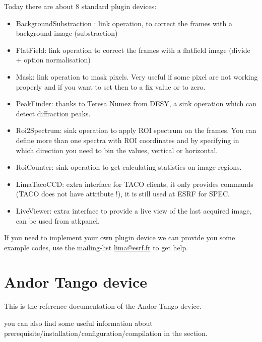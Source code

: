 \documentclass[letterpaper,10pt,english]{sphinxmanual}
\begin{document}
Today there are about  8 standard plugin devices:
\begin{itemize}
\item {} 
BackgroundSubstraction : link operation, to correct the frames with a background image (substraction)

\item {} 
FlatField:               link operation to correct the frames with a flatfield image (divide + option normalisation)

\item {} 
Mask:                    link operation to mask pixels. Very useful if some pixel are not working properly and if you want to set then to a fix value or to zero.

\item {} 
PeakFinder:              thanks to Teresa Numez from DESY, a sink operation which can detect diffraction peaks.

\item {} 
Roi2Spectrum:            sink operation to apply ROI spectrum on the frames. You can define more than one spectra with ROI coordinates and by specifying in which direction you need to bin the values, vertical or horizontal.

\item {} 
RoiCounter:              sink operation to get calculating statistics on image regions.

\item {} 
LimaTacoCCD: extra interface for TACO clients, it only provides commands (TACO does not have attribute !), it is still used at ESRF for SPEC.

\item {} 
LiveViewer:  extra interface  to provide a live view of the last acquired image, can be used from atkpanel.

\end{itemize}

If you need to implement your own plugin device we can provide you some example codes, use the mailing-list \href{mailto:lima@esrf.fr}{lima@esrf.fr} to get help.


\chapter{Andor Tango device}
\label{AndorCCD/andorccd::doc}\label{AndorCCD/andorccd:andor-tango-device}
This is the reference documentation of the Andor Tango device.

you can also find some useful information about prerequisite/installation/configuration/compilation in the  section.
\end{document}
